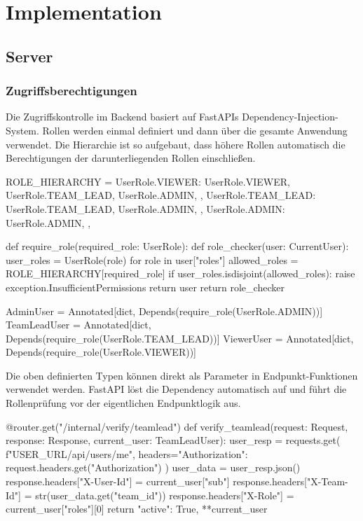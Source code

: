 ﻿%

\section{Implementation}

\subsection{Server}

\subsubsection{Zugriffsberechtigungen}
\label{sec:impl_zugriffsberechtigungen}

Die Zugriffskontrolle im Backend basiert auf FastAPIs 
Dependency-Injection-System. Rollen werden einmal definiert und dann 
über die gesamte Anwendung verwendet. Die Hierarchie ist so aufgebaut, 
dass höhere Rollen automatisch die Berechtigungen der darunterliegenden Rollen einschließen.

\begin{CodeBox}[language=Python]
ROLE_HIERARCHY = {
    UserRole.VIEWER: {
        UserRole.VIEWER,
        UserRole.TEAM_LEAD,
        UserRole.ADMIN,
    },
    UserRole.TEAM_LEAD: {
        UserRole.TEAM_LEAD,
        UserRole.ADMIN,
    },
    UserRole.ADMIN: {
        UserRole.ADMIN,
    },
}

def require_role(required_role: UserRole):
    def role_checker(user: CurrentUser):
        user_roles = {UserRole(role) for role in user["roles"]}
        allowed_roles = ROLE_HIERARCHY[required_role]
        if user_roles.isdisjoint(allowed_roles):
            raise exception.InsufficientPermissions
        return user
    return role_checker

AdminUser = Annotated[dict, Depends(require_role(UserRole.ADMIN))]
TeamLeadUser = Annotated[dict, Depends(require_role(UserRole.TEAM_LEAD))]
ViewerUser = Annotated[dict, Depends(require_role(UserRole.VIEWER))]
\end{CodeBox}

Die oben definierten Typen können direkt als Parameter in Endpunkt-Funktionen verwendet werden.
FastAPI löst die Dependency automatisch auf und führt die Rollenprüfung vor der eigentlichen Endpunktlogik aus.

\begin{CodeBox}[language=Python, caption={Verwendung der Rollendependencies in Endpunkten}]
@router.get("/internal/verify/teamlead")
def verify_teamlead(request: Request, response: Response,
                    current_user: TeamLeadUser):
    user_resp = requests.get(
        f"{USER_URL}/api/users/me",
        headers={"Authorization": request.headers.get("Authorization")}
    )
    user_data = user_resp.json()
    response.headers["X-User-Id"] = current_user["sub"]
    response.headers["X-Team-Id"] = str(user_data.get("team_id"))
    response.headers["X-Role"] = current_user["roles"][0]
    return {"active": True, **current_user}
\end{CodeBox}

